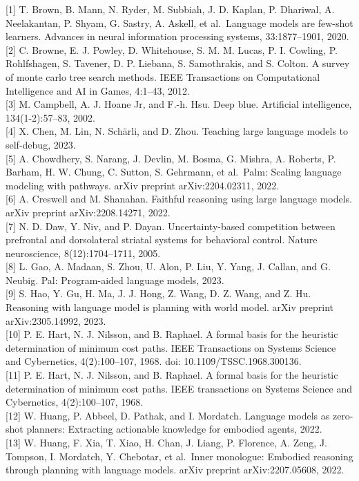 \documentclass[
]{article}
\begin{document}
{[}1{]} T. Brown, B. Mann, N. Ryder, M. Subbiah, J. D. Kaplan, P.
Dhariwal, A. Neelakantan, P. Shyam, G. Sastry, A. Askell, et
al.~Language models are few-shot learners. Advances in neural
information processing systems, 33:1877--1901, 2020.\\
{[}2{]} C. Browne, E. J. Powley, D. Whitehouse, S. M. M. Lucas, P. I.
Cowling, P. Rohlfshagen, S. Tavener, D. P. Liebana, S. Samothrakis, and
S. Colton. A survey of monte carlo tree search methods. IEEE
Transactions on Computational Intelligence and AI in Games, 4:1--43,
2012.\\
{[}3{]} M. Campbell, A. J. Hoane Jr, and F.-h. Hsu. Deep blue.
Artificial intelligence, 134(1-2):57--83, 2002.\\
{[}4{]} X. Chen, M. Lin, N. Schärli, and D. Zhou. Teaching large
language models to self-debug, 2023.\\
{[}5{]} A. Chowdhery, S. Narang, J. Devlin, M. Bosma, G. Mishra, A.
Roberts, P. Barham, H. W. Chung, C. Sutton, S. Gehrmann, et al.~Palm:
Scaling language modeling with pathways. arXiv preprint
arXiv:2204.02311, 2022.\\
{[}6{]} A. Creswell and M. Shanahan. Faithful reasoning using large
language models. arXiv preprint arXiv:2208.14271, 2022.\\
{[}7{]} N. D. Daw, Y. Niv, and P. Dayan. Uncertainty-based competition
between prefrontal and dorsolateral striatal systems for behavioral
control. Nature neuroscience, 8(12):1704--1711, 2005.\\
{[}8{]} L. Gao, A. Madaan, S. Zhou, U. Alon, P. Liu, Y. Yang, J. Callan,
and G. Neubig. Pal: Program-aided language models, 2023.\\
{[}9{]} S. Hao, Y. Gu, H. Ma, J. J. Hong, Z. Wang, D. Z. Wang, and Z.
Hu. Reasoning with language model is planning with world model. arXiv
preprint arXiv:2305.14992, 2023.\\
{[}10{]} P. E. Hart, N. J. Nilsson, and B. Raphael. A formal basis for
the heuristic determination of minimum cost paths. IEEE Transactions on
Systems Science and Cybernetics, 4(2):100--107, 1968. doi:
10.1109/TSSC.1968.300136.\\
{[}11{]} P. E. Hart, N. J. Nilsson, and B. Raphael. A formal basis for
the heuristic determination of minimum cost paths. IEEE transactions on
Systems Science and Cybernetics, 4(2):100--107, 1968.\\
{[}12{]} W. Huang, P. Abbeel, D. Pathak, and I. Mordatch. Language
models as zero-shot planners: Extracting actionable knowledge for
embodied agents, 2022.\\
{[}13{]} W. Huang, F. Xia, T. Xiao, H. Chan, J. Liang, P. Florence, A.
Zeng, J. Tompson, I. Mordatch, Y. Chebotar, et al.~Inner monologue:
Embodied reasoning through planning with language models. arXiv preprint
arXiv:2207.05608, 2022.
\end{document}

